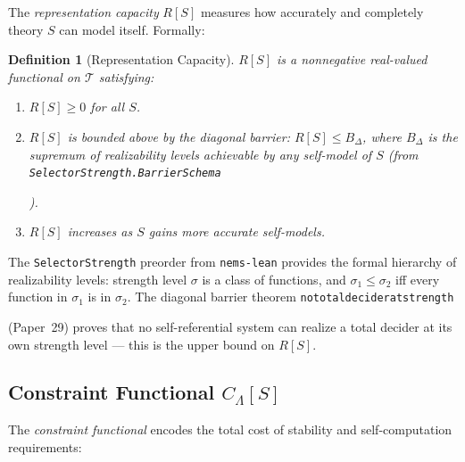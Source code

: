 \documentclass[11pt]{article}
\newtheorem{definition}[theorem]{Definition}
\theoremstyle{remark}
\newcommand{\lean}[1]{%
  \penalty-100
  \begingroup
  \def\_{\textunderscore\allowbreak}%
  \texttt{#1}%
  \endgroup
}
\begin{document}
The \emph{representation capacity} $R[S]$ measures how accurately and completely
theory $S$ can model itself. Formally:

\begin{definition}[Representation Capacity]
\label{def:rep_capacity}
$R[S]$ is a nonnegative real-valued functional on $\mathcal{T}$ satisfying:
\begin{enumerate}[leftmargin=2.5em]
\item $R[S] \geq 0$ for all $S$.
\item $R[S]$ is bounded above by the \emph{diagonal barrier}:
  $R[S] \leq B_\Delta$, where $B_\Delta$ is the supremum of realizability levels
  achievable by any self-model of $S$ (from \lean{SelectorStrength.BarrierSchema}
  \cite{SpivackNEMSHub}).
\item $R[S]$ increases as $S$ gains more accurate self-models.
\end{enumerate}
\end{definition}

The \lean{SelectorStrength} preorder from \texttt{nems-lean} provides the formal
hierarchy of realizability levels: strength level $\sigma$ is a class of
functions, and $\sigma_1 \leq \sigma_2$ iff every function in $\sigma_1$ is in
$\sigma_2$. The diagonal barrier theorem \lean{no\_total\_decider\_at\_strength}
(Paper~29) proves that no self-referential system can realize a total decider
at its own strength level --- this is the upper bound on $R[S]$.

\subsection{Constraint Functional $C_\Lambda[S]$}
\label{sec:constraint}

The \emph{constraint functional} encodes the total cost of stability and
self-computation requirements:
\end{document}
